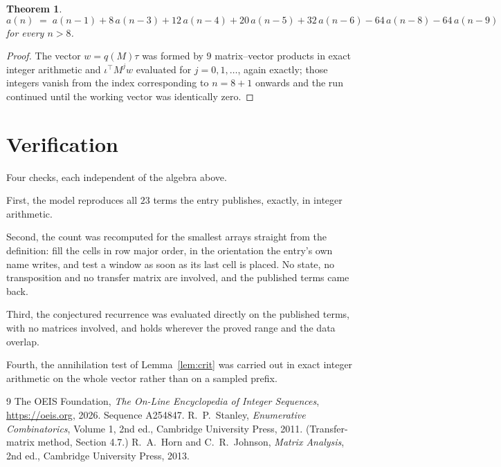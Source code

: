 \documentclass[11pt,a4paper]{article}
\theoremstyle{plain}
\newtheorem{theorem}{Theorem}
\theoremstyle{definition}
\begin{document}
\begin{theorem}
\[
a(n)\;=\;a(n-1) + 8\,a(n-3) + 12\,a(n-4) + 20\,a(n-5) + 32\,a(n-6) - 64\,a(n-8) - 64\,a(n-9)
\]
for every $n>8$.
\end{theorem}

\begin{proof}
The vector $w=q(M)\tau$ was formed by $9$ matrix--vector products in exact integer
arithmetic and $\iota^{\!\top}M^{j}w$ evaluated for $j=0,1,\dots$, again exactly; those
integers vanish from the index corresponding to $n=8+1$ onwards and the run continued
until the working vector was identically zero.
\end{proof}

\section{Verification}

Four checks, each independent of the algebra above.

First, the model reproduces all $23$ terms the entry publishes, exactly, in integer
arithmetic.

Second, the count was recomputed for the smallest arrays straight from the definition: fill the
cells in row major order, in the orientation the entry's own name writes, and test a window as
soon as its last cell is placed. No state, no transposition and no transfer matrix are
involved, and the published terms came back.

Third, the conjectured recurrence was evaluated directly on the published terms, with no
matrices involved, and holds wherever the proved range and the data overlap.

Fourth, the annihilation test of Lemma~\ref{lem:crit} was carried out in exact integer
arithmetic on the whole vector rather than on a sampled prefix.

\begin{thebibliography}{9}
 The OEIS Foundation, \emph{The On-Line Encyclopedia of Integer
Sequences}, \url{https://oeis.org}, 2026. Sequence A254847.
 R.~P.~Stanley, \emph{Enumerative Combinatorics}, Volume 1, 2nd ed.,
Cambridge University Press, 2011. (Transfer-matrix method, Section 4.7.)
 R.~A.~Horn and C.~R.~Johnson, \emph{Matrix Analysis}, 2nd ed., Cambridge
University Press, 2013.
\end{thebibliography}
\end{document}
